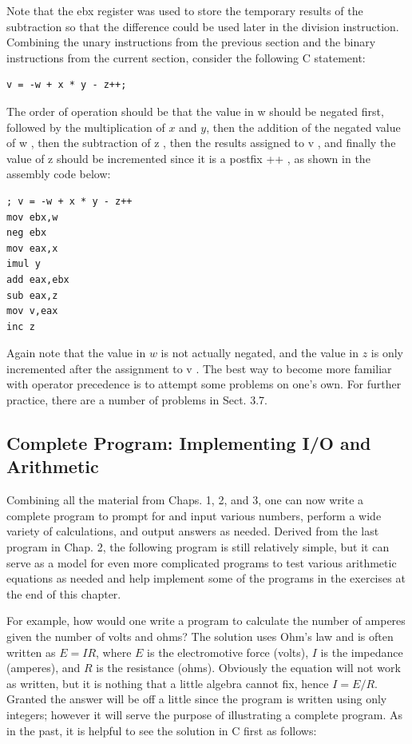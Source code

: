\documentclass[10pt]{book}
\begin{document}
Note that the ebx register was used to store the temporary results of the subtraction so that the difference could be used later in the division instruction. Combining the unary instructions from the previous section and the binary instructions from the current section, consider the following C statement:

\begin{verbatim}
v = -w + x * y - z++;
\end{verbatim}

The order of operation should be that the value in w should be negated first, followed by the multiplication of $x$ and $y$, then the addition of the negated value of w , then the subtraction of z , then the results assigned to v , and finally the value of z should be incremented since it is a postfix ++ , as shown in the assembly code below:

\begin{verbatim}
; v = -w + x * y - z++
mov ebx,w
neg ebx
mov eax,x
imul y
add eax,ebx
sub eax,z
mov v,eax
inc z
\end{verbatim}

Again note that the value in $w$ is not actually negated, and the value in $z$ is only incremented after the assignment to v . The best way to become more familiar with operator precedence is to attempt some problems on one's own. For further practice, there are a number of problems in Sect. 3.7.

\subsection{Complete Program: Implementing I/O and Arithmetic}
Combining all the material from Chaps. 1, 2, and 3, one can now write a complete program to prompt for and input various numbers, perform a wide variety of calculations, and output answers as needed. Derived from the last program in Chap. 2, the following program is still relatively simple, but it can serve as a model for even more complicated programs to test various arithmetic equations as needed and help implement some of the programs in the exercises at the end of this chapter.

For example, how would one write a program to calculate the number of amperes given the number of volts and ohms? The solution uses Ohm's law and is often written as $E=I R$, where $E$ is the electromotive force (volts), $I$ is the impedance (amperes), and $R$ is the resistance (ohms). Obviously the equation will not work as written, but it is nothing that a little algebra cannot fix, hence $I=E / R$. Granted the answer will be off a little since the program is written using only integers; however it will serve the purpose of illustrating a complete program. As in the past, it is helpful to see the solution in C first as follows:
\end{document}
